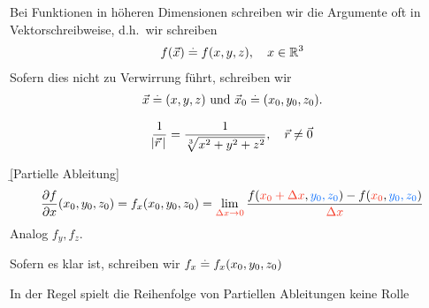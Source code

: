 \documentclass[12pt]{article}
\begin{document}
\begin{ntn}
    Bei Funktionen in höheren Dimensionen schreiben wir die Argumente oft in Vektorschreibweise, d.h.\ wir schreiben
    \begin{align}
        f(\vec{x})\overset{.}{=} f(x,y,z), \quad x\in\mathbb{R}^3
    \end{align}
    Sofern dies nicht zu Verwirrung führt, schreiben wir
    \begin{align}
        \vec{x}\overset{.}{=}(x,y,z) \text{ und } \vec{x}_0\overset{.}{=}(x_0,y_0,z_0).
    \end{align}
\end{ntn}

\begin{defn}{} \begin{align*}
        \dfrac{1}{\abs{\vec{r}\,}}=\dfrac{1}{\sqrt[3]{x^2+y^2+z^2}}, \quad \vec{r}\neq\vec{0}
    \end{align*}
\end{defn}

\begin{defn}{\b{{[Partielle Ableitung]}}}
    \begin{align}
        \pdv{f}{x}(x_0,y_0,z_0)=f_x(x_0,y_0,z_0)=\lim_{\r{\Delta x\to0}}\frac{f(\r{x_0+\Delta x},\b{y_0,z_0})-f(\r{x_0},\b{y_0,z_0
            })}{\r{\Delta x}}
    \end{align}
    Analog $f_y,f_z$.
\end{defn}\vspace*{1em}

\begin{ntn}
    Sofern es klar ist, schreiben wir $f_x\overset{.}{=} f_x(x_0,y_0,z_0)$
\end{ntn}

\begin{thmb}{}
    In der Regel spielt die Reihenfolge von Partiellen Ableitungen keine Rolle
\end{thmb}
\end{document}
